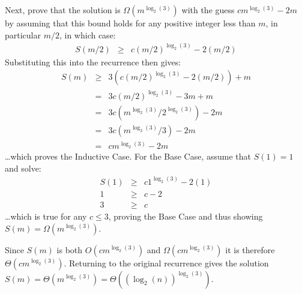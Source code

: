 \documentclass{article}
\begin{document}
Next, prove that the solution is $\Omega(m^{\log_2(3)})$ with the guess $cm^{\log_2(3)} - 2m$ by assuming that this bound holds for any positive integer less than $m$, in particular $m/2$, in which case:
\begin{eqnarray*}
	S(m/2) &\geq& c(m/2)^{\log_2(3)} - 2(m/2)
\end{eqnarray*}
Substituting this into the recurrence then gives:
\begin{eqnarray*}
	S(m) &\geq& 3(c(m/2)^{\log_2(3)} - 2(m/2)) + m \\
	 &=& 3c(m/2)^{\log_2(3)} - 3m + m \\
	 &=& 3c(m^{\log_2(3)}/2^{\log_2(3)}) - 2m \\
	 &=& 3c(m^{\log_2(3)}/3) - 2m \\
	 &=& cm^{\log_2(3)} - 2m
\end{eqnarray*}
\ldots which proves the Inductive Case.  For the Base Case, assume that $S(1) = 1$ and solve:
\begin{eqnarray*}
	S(1) &\geq& c1^{\log_2(3)} - 2(1) \\
	1 &\geq& c - 2 \\
	3 &\geq& c
\end{eqnarray*}
\ldots which is true for any $c \leq 3$, proving the Base Case and thus showing $S(m) = \Omega(m^{\log_2(3)})$.

Since $S(m)$ is both $O(cm^{\log_2(3)})$ and $\Omega(cm^{\log_2(3)})$ it is therefore $\Theta(cm^{\log_2(3)})$.  Returning to the original recurrence gives the solution $S(m) = \Theta(m^{\log_2(3)}) = \Theta((\log_2(n))^{\log_2(3)})$.
\end{document}
